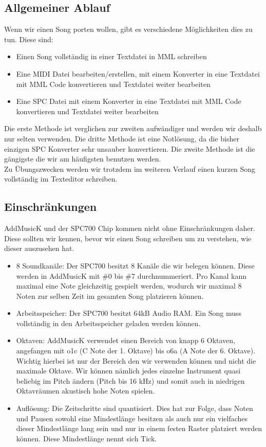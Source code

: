 \subsection*{Allgemeiner Ablauf}
Wenn wir einen Song porten wollen, gibt es verschiedene Möglichkeiten dies zu tun. Diese sind:
\begin{itemize}
	\item Einen Song vollständig in einer Textdatei in MML schreiben
	\item Eine MIDI Datei bearbeiten/erstellen, mit einem Konverter in eine Textdatei mit MML Code konvertieren und Textdatei weiter bearbeiten
	\item Eine SPC Datei mit einem Konverter in eine Textdatei mit MML Code konvertieren und Textdatei weiter bearbeiten
\end{itemize}

\medskip

Die erste Methode ist verglichen zur zweiten aufwändiger und werden wir deshalb nur selten verwenden. Die dritte Methode ist eine Notlösung, da die bisher einzigen SPC Konverter sehr unsauber konvertieren. Die zweite Methode ist die gängigste die wir am häufigsten benutzen werden. \\

Zu Übungszwecken werden wir trotzdem im weiteren Verlauf einen kurzen Song vollständig im Texteditor schreiben.


\subsection*{Einschränkungen}
AddMusicK und der SPC700 Chip kommen nicht ohne Einschränkungen daher. Diese sollten wir kennen, bevor wir einen Song schreiben um zu verstehen, wie dieser auszusehen hat.

\begin{itemize}
	\item 8 Soundkanäle: Der SPC700 besitzt 8 Kanäle die wir belegen können. Diese werden in AddMusicK mit \#0 bis \#7 durchnummeriert. Pro Kanal kann maximal eine Note gleichzeitig gespielt werden, wodurch wir maximal 8 Noten zur selben Zeit im gesamten Song platzieren können.
	\item Arbeitsspeicher: Der SPC700 besitzt 64kB Audio RAM. Ein Song muss vollständig in den Arbeitsspeicher geladen werden können.
	\item Oktaven: AddMusicK verwendet einen Bereich von knapp 6 Oktaven, angefangen mit o1c (C Note der 1. Oktave) bis o6a (A Note der 6. Oktave). Wichtig hierbei ist nur der Bereich den wir verwenden können und nicht die maximale Oktave. Wir können nämlich jedes einzelne Instrument quasi beliebig im Pitch ändern (Pitch bis 16 kHz) und somit auch in niedrigen Oktavräumen akustisch hohe Noten spielen.
	\item Auflösung: Die Zeitschritte sind quantisiert. Dies hat zur Folge, dass Noten und Pausen sowohl eine Mindestlänge besitzen als auch nur ein vielfaches dieser Mindestlänge lang sein und nur in einem festen Raster platziert werden können. Diese Mindestlänge nennt sich Tick.
\end{itemize}

